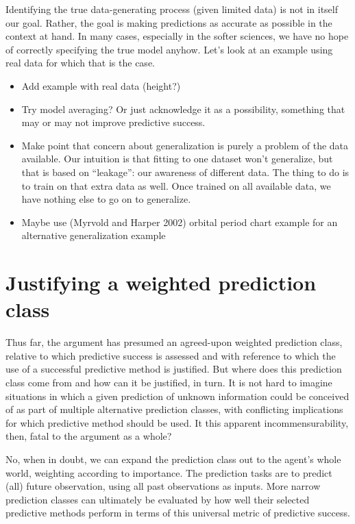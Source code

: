 \documentclass[
  letterpaper,
  DIV=11,
  numbers=noendperiod]{scrartcl}
\providecommand{\tightlist}{%
  \setlength{\itemsep}{0pt}\setlength{\parskip}{0pt}}\usepackage{longtable,booktabs,array}
\theoremstyle{definition}
\theoremstyle{remark}
\begin{document}
Identifying the true data-generating process (given limited data) is not
in itself our goal. Rather, the goal is making predictions as accurate
as possible in the context at hand. In many cases, especially in the
softer sciences, we have no hope of correctly specifying the true model
anyhow. Let's look at an example using real data for which that is the
case.

\begin{itemize}
\tightlist
\item
  Add example with real data (height?)
\item
  Try model averaging? Or just acknowledge it as a possibility,
  something that may or may not improve predictive success.
\item
  Make point that concern about generalization is purely a problem of
  the data available. Our intuition is that fitting to one dataset won't
  generalize, but that is based on ``leakage'': our awareness of
  different data. The thing to do is to train on that extra data as
  well. Once trained on all available data, we have nothing else to go
  on to generalize.
\item
  Maybe use (Myrvold and Harper 2002) orbital period chart example for
  an alternative generalization example
\end{itemize}

\section{Justifying a weighted prediction class}\label{sec-class}

Thus far, the argument has presumed an agreed-upon weighted prediction
class, relative to which predictive success is assessed and with
reference to which the use of a successful predictive method is
justified. But where does this prediction class come from and how can it
be justified, in turn. It is not hard to imagine situations in which a
given prediction of unknown information could be conceived of as part of
multiple alternative prediction classes, with conflicting implications
for which predictive method should be used. It this apparent
incommensurability, then, fatal to the argument as a whole?

No, when in doubt, we can expand the prediction class out to the agent's
whole world, weighting according to importance. The prediction tasks are
to predict (all) future observation, using all past observations as
inputs. More narrow prediction classes can ultimately be evaluated by
how well their selected predictive methods perform in terms of this
universal metric of predictive success.
\end{document}

